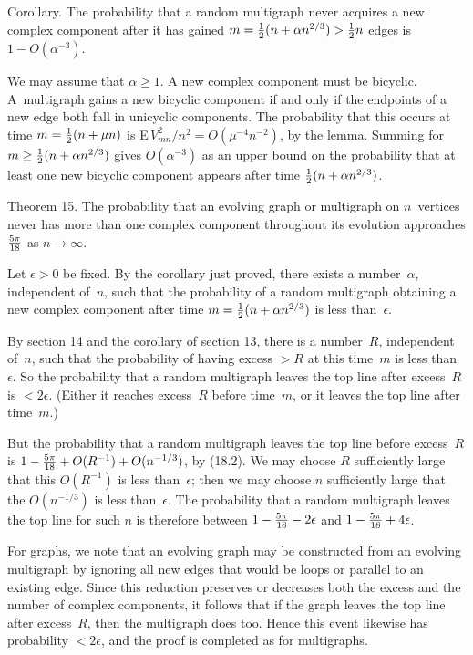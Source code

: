 \proclaim
Corollary.
The probability that a random multigraph never acquires a new complex
component after it has gained $m={1\over2} (n+\alpha n^{2/3})>{1\over
2}n$ edges is $1-O(\alpha^{-3})$.

\proof
We may assume that $\alpha\geq 1$. A new complex component must be
bicyclic. A~multigraph gains a new bicyclic component if and only if
the endpoints of a new edge both fall in unicyclic components. The
probability that this occurs at time $m={1\over2} (n+\mu n)$ is
E$\,V_{mn}^2\!/n^2=O(\mu^{-4}n^{-2})$, by the lemma. Summing for
$m\geq{1\over2} (n+\alpha n^{2/3})$ gives $O(\alpha^{-3})$ as an upper
bound on the probability that at least one new bicyclic component
appears after time ${1\over2} (n+\alpha n^{2/3})$.\quad\pfbox

\proclaim Theorem 15. The probability that an evolving graph or multigraph on
$n$~vertices never has more than one complex component throughout its
evolution approaches ${5\pi\over 18}$ as $n\rightarrow\infty$.

\proof
Let $\epsilon>0$ be fixed. By the corollary just proved, there exists
a number~$\alpha$, independent of~$n$, such that the probability of a
random multigraph obtaining a new complex component after time $m={1\over
2}(n+\alpha n^{2/3})$ is less than~$\epsilon$.

By section 14 and the corollary of section 13, there is a number~$R$,
independent of~$n$, such that the probability of having excess $>R$ at
this time~$m$ is less than~$\epsilon$. So the probability that a
random multigraph leaves the top line after excess~$R$ is $<2\epsilon$.
(Either it reaches excess~$R$ before time~$m$, or it leaves the top
line after time~$m$.)

But the probability that a random multigraph leaves the top line
before excess~$R$ is $1-{5\pi\over 18}+O(R^{-1})+O(n^{-1/3})$, by
(18.2). We may choose $R$ sufficiently large that this $O(R^{-1})$ is
less than~$\epsilon$; then we may choose $n$ sufficiently large that
the $O(n^{-1/3})$ is less than~$\epsilon$. The probability that a
random multigraph leaves the top line for such $n$ is therefore
between
$1-{5\pi\over 18}-2\epsilon$ and $1-{5\pi\over
18}+4\epsilon$.

For graphs, we note that an evolving graph may be constructed from an evolving
multigraph by ignoring all new edges that would be loops or parallel to
an existing edge. Since this reduction preserves or decreases both the
excess and the number of complex components, it follows that if the graph
leaves the top line after excess~$R$, then the multigraph does too.
Hence this event likewise has probability $<2\epsilon$, and the proof
is completed as for multigraphs.\quad\pfbox


